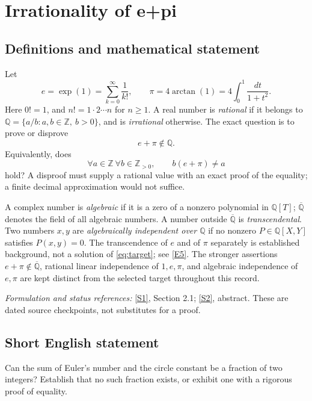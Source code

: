 \documentclass[11pt]{article}
\newcommand{\Q}{\mathbb Q}
\newcommand{\Z}{\mathbb Z}
\newcommand{\Qbar}{\overline{\mathbb Q}}
\begin{document}
\section*{\texorpdfstring{Irrationality of e+pi}{Irrationality of e+pi}}\label{30006974}
\label{problem:pi-plus-e}

\subsection{Definitions and mathematical statement}
Let
\[
 e=\exp(1)=\sum_{k=0}^{\infty}\frac1{k!},\qquad
 \pi=4\arctan(1)=4\int_0^1\frac{dt}{1+t^2}.
\]
Here $0!=1$, and $n!=1\cdot2\cdots n$ for $n\ge1$. A real number is
\emph{rational} if it belongs to
$\Q=\{a/b:a,b\in\Z,\ b>0\}$, and is \emph{irrational} otherwise.
The exact question is to prove or disprove
\begin{equation}\label{eq:target}
 \boxed{e+\pi\notin\Q.}
\end{equation}
Equivalently, does
\[
 \forall a\in\Z\ \forall b\in\Z_{>0},\qquad b(e+\pi)\ne a
\]
hold? A disproof must supply a rational value with an exact proof of the
equality; a finite decimal approximation would not suffice.

A complex number is \emph{algebraic} if it is a zero of a nonzero polynomial
in $\Q[T]$; $\Qbar$ denotes the field of all algebraic numbers. A number
outside $\Qbar$ is \emph{transcendental}. Two numbers $x,y$ are
\emph{algebraically independent over $\Q$} if no nonzero
$P\in\Q[X,Y]$ satisfies $P(x,y)=0$.
The transcendence of $e$ and of $\pi$ separately is established background,
not a solution of \eqref{eq:target}; see
\href{https://webusers.imj-prg.fr/~michel.waldschmidt/articles/pdf/ColloquiumDeGiorgiSchanuelConjecture2014.pdf}{[E5]}.
The stronger assertions $e+\pi\notin\Qbar$, rational linear independence
of $1,e,\pi$, and algebraic independence of $e,\pi$ are kept distinct
from the selected target throughout this record.

\par\smallskip\textit{Formulation and status references:}
\href{https://arxiv.org/html/2311.00546v2}{[S1]}, Section 2.1;
\href{https://arxiv.org/abs/2606.17303}{[S2]}, abstract.
These are dated source checkpoints, not substitutes for a proof.

\subsection{Short English statement}
Can the sum of Euler's number and the circle constant be a fraction of two
integers? Establish that no such fraction exists, or exhibit one with a
rigorous proof of equality.
\end{document}
